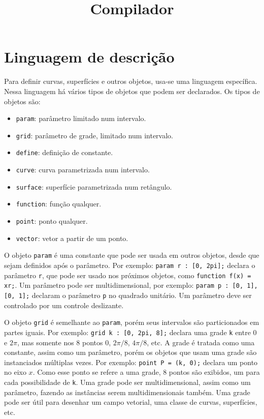 \documentclass[10pt,a4paper]{article}
\title{Compilador}
\date{}
\author{}
\begin{document}

\maketitle

\newpage
\section{Linguagem de descrição}
Para definir curvas, superfícies e outros objetos, usa-se uma linguagem específica.
Nessa linguagem há vários tipos de objetos que podem ser declarados. Os tipos de objetos são:
\begin{itemize}
\item \texttt{param}: parâmetro limitado num intervalo.
\item \texttt{grid}: parâmetro de grade, limitado num intervalo.
\item \texttt{define}: definição de constante.
\item \texttt{curve}: curva parametrizada num intervalo.
\item \texttt{surface}: superfície parametrizada num retângulo.
\item \texttt{function}: função qualquer.
\item \texttt{point}: ponto qualquer.
\item \texttt{vector}: vetor a partir de um ponto.
\end{itemize}

O objeto \texttt{param} é uma constante que pode ser usada em outros objetos,
desde que sejam definidos após o parâmetro.
Por exemplo: \texttt{param r : [0, 2pi];} declara o parâmetro \texttt{r},
que pode ser usado nos próximos objetos, como \texttt{function f(x) = xr;}.
Um parâmetro pode ser multidimensional, por exemplo: \texttt{param p : [0, 1], [0, 1];}
declaram o parâmetro \texttt{p} no quadrado unitário.	Um parâmetro deve ser controlado por um controle deslizante.

O objeto \texttt{grid} é semelhante ao \texttt{param}, porém seus intervalos são particionados em partes iguais.
Por exemplo: \texttt{grid k : [0, 2pi, 8];} declara uma grade \texttt{k} entre $0$ e $2\pi$,
mas somente nos 8 pontos $0$, $2\pi/8$, $4\pi/8$, etc.
A grade é tratada como uma constante, assim como um parâmetro,
porém os objetos que usam uma grade são instanciados múltiplas vezes.
Por exemplo: \texttt{point P = (k, 0);} declara um ponto no eixo $x$.
Como esse ponto se refere a uma grade, 8 pontos são exibidos, um para cada possibilidade de \texttt{k}.
Uma grade pode ser multidimensional, assim como um parâmetro, fazendo as instâncias serem multidimensionais também.
Uma grade pode ser útil para desenhar um campo vetorial, uma classe de curvas, superfícies, etc.
\end{document}
